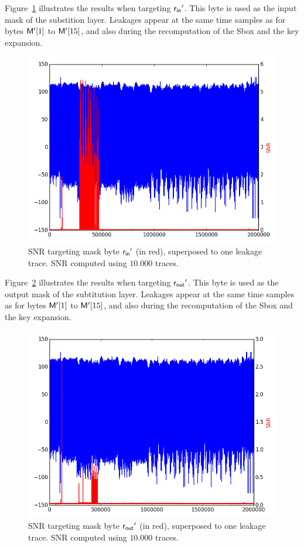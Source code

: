 Figure~\ref{fig:SNR_rin2} illustrates the results when targeting $\mathsf{r_{in}}'$. This byte is used as the input mask of the substition layer.
Leakages appear at the same time samples as for bytes $\mathsf{M'}[1]$ to $\mathsf{M'}[15]$, and also during the recomputation of the Sbox and the key expansion.
\begin{figure}[H]
	\centering 
	\includegraphics[scale=0.35]{figures/2Mpts/SNR_M35_10ktraces.png}
	\caption{SNR targeting mask byte $\mathsf{r_{in}}'$ (in red), superposed to one leakage trace. SNR computed using $10.000$ traces.}
	\label{fig:SNR_rin2}
\end{figure}

Figure~\ref{fig:SNR_beta2} illustrates the results when targeting $\mathsf{r_{out}}'$. This byte is used as the output mask of the subtitution layer. 
Leakages appear at the same time samples as for bytes $\mathsf{M'}[1]$ to $\mathsf{M'}[15]$, and also during the recomputation of the Sbox and the key expansion.
\begin{figure}[H]
	\centering 
	\includegraphics[scale=0.35]{figures/2Mpts/SNR_M36_10ktraces.png}
	\caption{SNR targeting mask byte $\mathsf{r_{out}}'$ (in red), superposed to one leakage trace. SNR computed using $10.000$ traces.}
	\label{fig:SNR_beta2}
\end{figure}

